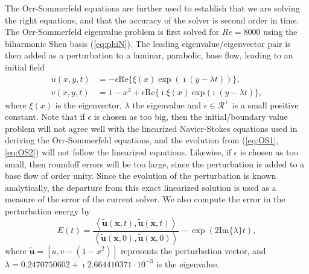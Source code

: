 \documentclass[preprint]{elsarticle}
\begin{document}
The Orr-Sommerfeld equations are further used to establish that we are solving the right equations, and that the accuracy of the solver is second order in time. The Orr-Sommerfeld eigenvalue problem is first solved for $Re=8000$ using the biharmonic Shen basis (\ref{eq:phiN}). The leading eigenvalue/eigenvector pair is then added as a perturbation to a laminar, parabolic, base flow, leading to an initial field
\begin{align}
u(x,y,t) &= -\epsilon  \mathrm{Re}\{\xi(x) \exp (\imath (y-\lambda t))\}, \label{eq:OS1} \\
v(x,y,t) &= 1-x^2 + \epsilon \mathrm{Re}\{\imath \xi(x) \exp(\imath(y-\lambda t)\}, \label{eq:OS2}
\end{align}
where $\xi(x)$ is the eigenvector, $\lambda$ the eigenvalue and $\epsilon \in \mathcal{R}^+$ is a small positive constant. Note that if $\epsilon$ is chosen as too big, then the initial/boundary value problem will not agree well with the linearized Navier-Stokes equations used in deriving the Orr-Sommerfeld equations, and the evolution from (\ref{eq:OS1}, \ref{eq:OS2}) will not follow the linearized equations. Likewise, if $\epsilon$ is chosen as too small, then roundoff errors will be too large, since the perturbation is added to a base flow of order unity.  Since the evolution of the perturbation is known analytically, the departure from this exact linearized solution is used as a measure of the error of the current solver. We also compute the error in the perturbation energy by
\begin{equation}
E(t) =  \frac{\left<\tilde{\bm{u}}(\bm{x}, t), \tilde{\bm{u}}(\bm{x}, t) \right>}{\left<\tilde{\bm{u}}(\bm{x}, 0), \tilde{\bm{u}}(\bm{x}, 0) \right>}  - \exp(2 \mathrm{Im}\{\lambda\}t), \label{eq:OSenergy}
\end{equation}
where $\tilde{\bm{u}} = [u, v-(1-x^2)]$ represents the perturbation vector, and $\lambda=0.2470750602+\imath 2.664410371\cdot 10^{-3}$ is the eigenvalue. 
\end{document}
